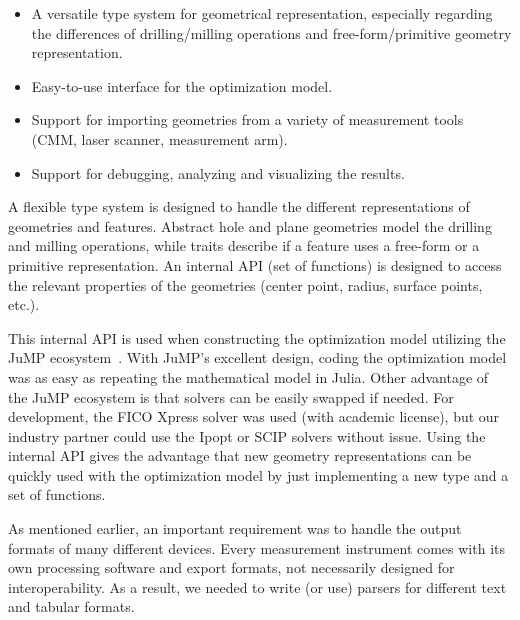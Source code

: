 \documentclass{juliacon}
\begin{document}
\begin{itemize}
	\item A versatile type system for geometrical representation, especially regarding the differences of drilling/milling operations and free-form/primitive geometry representation.
	\item Easy-to-use interface for the optimization model.
	\item Support for importing geometries from a variety of measurement tools (CMM, laser scanner, measurement arm).
	\item Support for debugging, analyzing and visualizing the results.
\end{itemize}

A flexible type system is designed to handle the different representations of geometries and features.
Abstract hole and plane geometries model the drilling and milling operations, while traits describe if a feature uses a free-form or a primitive representation.
An internal API (set of functions) is designed to access the relevant properties of the geometries (center point, radius, surface points, etc.).

This internal API is used when constructing the optimization model utilizing the JuMP ecosystem~\cite{Lubin2023}.
With JuMP's excellent design, coding the optimization model was as easy as repeating the mathematical model in Julia.
Other advantage of the JuMP ecosystem is that solvers can be easily swapped if needed.
For development, the FICO Xpress solver was used (with academic license), but our industry partner could use the Ipopt or SCIP solvers without issue.
Using the internal API gives the advantage that new geometry representations can be quickly used with the optimization model by just implementing a new type and a set of functions.

As mentioned earlier, an important requirement was to handle the output formats of many different devices.
Every measurement instrument comes with its own processing software and export formats, not necessarily designed for interoperability.
As a result, we needed to write (or use) parsers for different text and tabular formats.
\end{document}
